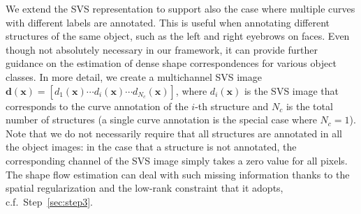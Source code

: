 



We extend the SVS representation to support also the case where multiple curves with different labels are annotated. This is useful when annotating different structures of the same object, such as the left and right eyebrows on faces. Even though not absolutely necessary in our framework, it can provide further guidance on the estimation of dense shape correspondences for various object classes. In more detail, we create a multichannel SVS image $\bm{d}(\bm{x})=[d_1(\bm{x}) \cdots d_i(\bm{x}) \cdots d_{N_c}(\bm{x})]$, where $d_i(\bm{x})$ is the SVS image that corresponds to the curve annotation of the $i$-th structure and $N_c$ is the total number of structures (a single curve annotation is the special case where $N_c=1$). Note that we do not necessarily require that all structures are annotated in all the object images: in the case that a structure is not annotated, the corresponding channel of the SVS image simply takes a zero value for all pixels. The shape flow estimation can deal with such missing information thanks to the spatial regularization and the low-rank constraint that it adopts, c.f.~Step~\ref{sec:step3}.

